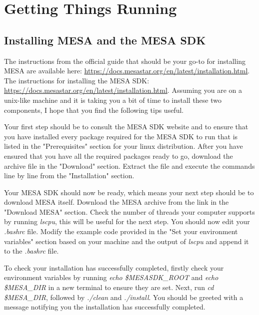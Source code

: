 \documentclass[12pt,hidelinks]{article}
\begin{document}
\section{Getting Things Running}
\vspace{10.5cm}
	\subsection{Installing MESA and the MESA SDK}
	        The instructions from the official guide that should be your go-to for installing MESA are available here: \url{https://docs.mesastar.org/en/latest/installation.html}. The instructions for installing the MESA SDK: \url{https://docs.mesastar.org/en/latest/installation.html}. Assuming you are on a unix-like machine and it is taking you a bit of time to install these two components, I hope that you find the following tips useful. \par
	        \vspace{0.5cm}
	        Your first step should be to consult the MESA SDK website and to ensure that you have installed every package required for the MESA SDK to run that is listed in the "Prerequisites" section for your linux distribution. After you have ensured that you have all the required packages ready to go, download the archive file in the "Download" section. Extract the file and execute the commands line by line from the "Installation" section. \par
	        \vspace{0.5cm}
	        Your MESA SDK should now be ready, which means your next step should be to download MESA itself. Download the MESA archive from the link in the "Download MESA" section. Check the number of threads your computer supports by running \emph{lscpu}, this will be useful for the next step. You should now edit your \emph{.bashrc} file. Modify the example code provided in the "Set your environment variables" section based on your machine and the output of \emph{lscpu} and append it to the \emph{.bashrc} file. \par 
	        \vspace{0.5cm}
	        To check your installation has successfully completed, firstly check your environment variables by running \emph{echo \$MESASDK\_ROOT} and \emph{echo \$MESA\_DIR} in a new terminal to ensure they are set. Next, run \emph{cd \$MESA\_DIR}, followed by \emph{./clean} and \emph{./install}. You should be greeted with a message notifying you the installation has successfully completed.
	    
\end{document}
